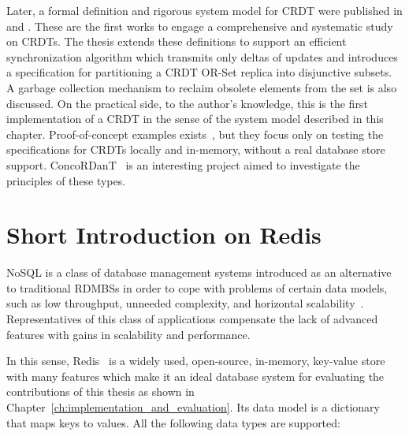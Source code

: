 Later, a formal definition and rigorous system model for CRDT were published
in \cite{shapiro:inria-00555588} and \cite{Shapiro:2011:CRD:2050613.2050642}.
These are the first works to engage a comprehensive and systematic study on
CRDTs. The thesis extends these definitions to support an efficient
synchronization algorithm which transmits only deltas of updates and introduces
a specification for partitioning a CRDT OR-Set replica into disjunctive subsets.
A garbage collection mechanism to reclaim obsolete elements from the set is also
discussed. On the practical side, to the author's knowledge, this is the first
implementation of a CRDT in the sense of the system model described in this
chapter. Proof-of-concept examples exists~\cite{ericmoritz, dominictarr}, but
they focus only on testing the specifications for CRDTs locally and in-memory,
without a real database store support. ConcoRDanT~\cite{concordant} is an
interesting project aimed to investigate the principles of these types.

\section{Short Introduction on Redis}
\label{sec:short_introduction_on_redis}

NoSQL is a class of database management systems introduced as an alternative to
traditional RDMBSs in order to cope with problems of certain data models, such
as low throughput, unneeded complexity, and horizontal scalability~\cite{nosql}.
Representatives of this class of applications compensate the lack of advanced
features with gains in scalability and performance.

In this sense, Redis~\cite{redis} is a widely used, open-source, in-memory,
key-value store with many features which make it an ideal database system for
evaluating the contributions of this thesis as shown in
Chapter~\ref{ch:implementation_and_evaluation}. Its data model is a dictionary
that maps keys to values. All the following data types are supported:

